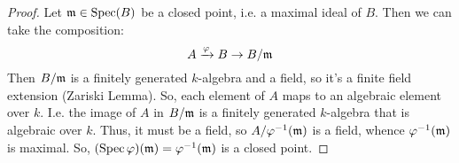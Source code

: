 \begin{proof}
	Let $\mathfrak{m} \in \operatorname{Spec}(B)$ be a closed point, i.e. a maximal ideal of $B$. Then we can take the composition:
	\[ A \xrightarrow{\varphi} B \to B/\mathfrak{m} \]
	Then $B/\mathfrak{m}$ is a finitely generated $k$-algebra and a field, so it's a finite field extension (Zariski Lemma). So, each element of $A$ maps to an algebraic element over $k$. I.e. the image of $A$ in $B/\mathfrak{m}$ is a finitely generated $k$-algebra that is algebraic over $k$. Thus, it must be a field, so $A/\varphi^{-1}(\mathfrak{m})$ is a field, whence $\varphi^{-1}(\mathfrak{m})$ is maximal. So, $(\operatorname{Spec}\varphi)(\mathfrak{m}) = \varphi^{-1}(\mathfrak{m})$ is a closed point.
\end{proof}
